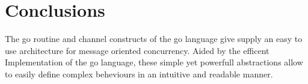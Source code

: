 \documentclass[12pt, a4paper]{report}
\begin{document}
\chapter{Conclusions}
The go routine and channel constructs of the go language give supply an easy to use architecture for message oriented concurrency. Aided by the efficent Implementation
 of the go language, these simple yet powerfull abstractions allow to easily define complex beheviours in an intuitive and readable manner.



\end{document}
